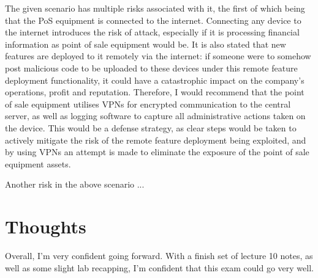 \documentclass[12pt]{report}
\begin{document}
The given scenario has multiple risks associated with it, the first of which being that the PoS equipment is connected to the internet. Connecting any device to the internet introduces the risk of attack, especially if it is processing financial information as point of sale equipment would be. It is also stated that new features are deployed to it remotely via the internet: if someone were to somehow post malicious code to be uploaded to these devices under this remote feature deployment functionality, it could have a catastrophic impact on the company's operations, profit and reputation. Therefore, I would recommend that the point of sale equipment utilises VPNs for encrypted communication to the central server, as well as logging software to capture all administrative actions taken on the device. This would be a defense strategy, as clear steps would be taken to actively mitigate the risk of the remote feature deployment being exploited, and by using VPNs an attempt is made to eliminate the exposure of the point of sale equipment assets.

Another risk in the above scenario ...

\section{Thoughts}
Overall, I'm very confident going forward. With a finish set of lecture 10 notes, as well as some slight lab recapping, I'm confident that this exam could go very well. 
\end{document}
